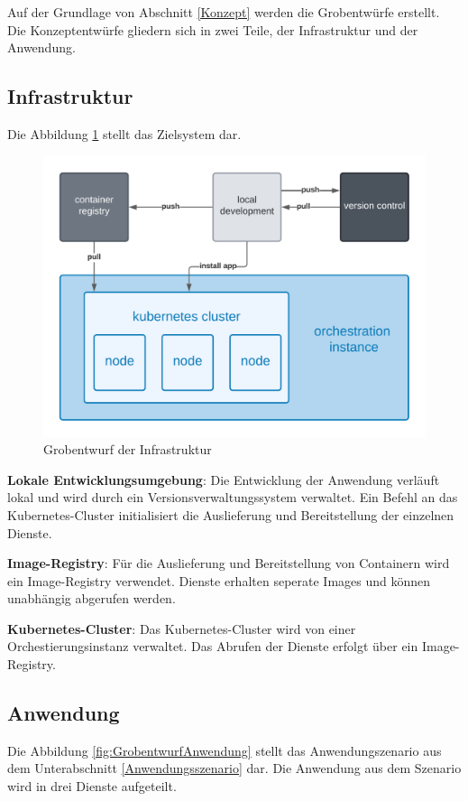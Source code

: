 Auf der Grundlage von Abschnitt \ref{Konzept} werden die Grobentwürfe erstellt.
Die Konzeptentwürfe gliedern sich in zwei Teile, der Infrastruktur und der Anwendung.

\subsection{Infrastruktur}
Die Abbildung \ref{fig:GrobentwurfInfrastruktur} stellt das Zielsystem dar.

\begin{figure}[!htb]
  \centering
  \includegraphics[width=0.8\columnwidth]{images/GrobentwurfInfrastruktur.png}
  \caption{Grobentwurf der Infrastruktur}
  \label{fig:GrobentwurfInfrastruktur}
\end{figure}

\textbf{Lokale Entwicklungsumgebung}: Die Entwicklung der Anwendung verläuft lokal und wird durch ein Versionsverwaltungssystem verwaltet.
Ein Befehl an das Kubernetes-Cluster initialisiert die Auslieferung und Bereitstellung der einzelnen Dienste. 

\textbf{Image-Registry}: Für die Auslieferung und Bereitstellung von Containern wird ein Image-Registry verwendet.
Dienste erhalten seperate Images und können unabhängig abgerufen werden.

\textbf{Kubernetes-Cluster}: Das Kubernetes-Cluster wird von einer Orchestierungsinstanz verwaltet.
Das Abrufen der Dienste erfolgt über ein Image-Registry.





\subsection{Anwendung}
Die Abbildung \ref{fig:GrobentwurfAnwendung} stellt das Anwendungszenario aus dem Unterabschnitt \ref{Anwendungsszenario} dar.
Die Anwendung aus dem Szenario wird in drei Dienste aufgeteilt.

